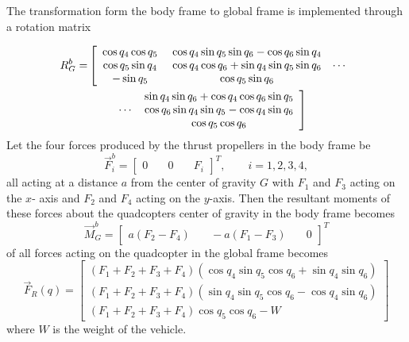 \documentclass[twocolumn,10pt]{asme2e}
\begin{document}
The transformation form the body frame to global frame is implemented through a rotation matrix
{\small
\begin{align}
	R^b_G=&
	\left[\begin{array}{ccc} \cos{q_{4}}\cos{q_{5}} &~ \cos{q_{4}}\sin{q_{5}}\sin{q_{6}}-\cos{q_{6}}\sin{q_{4}} & \\ 
		\cos{q_{5}}\sin{q_{4}} & ~\cos{q_{4}}\cos{q_{6}}+\sin{q_{4}}\sin{q_{5}}\sin{q_{6}} & \cdots\\ 
		-\sin{q_{5}} & ~\cos{q_{5}}\sin{q_{6}} &  \end{array}\right.\notag\\
&\qquad	
\left.\begin{array}{cc}
&\sin{q_{4}}\sin{q_{6}}+\cos{q_{4}}\cos{q_{6}}\sin{q_{5}}\\
\cdots&\cos{q_{6}}\sin{q_{4}}\sin{q_{5}}-\cos{q_{4}}\sin{q_{6}}\\
&\cos{q_{5}}\cos{q_{6}}\end{array}\right]
\end{align}
Let the four forces produced by the thrust propellers in the body frame be
\begin{equation}
\vec{F}_{i}^b=\left[\begin{array}{ccc}
	0&\quad
	0&\quad
	F_{i}
\end{array}\right]^T,\qquad i=1,2,3,4,
\end{equation}
all acting at a distance $a$ from the center of gravity $G$ with $F_1$ and $F_3$ acting on the $x$- axis and $F_2$ and $F_4$ acting on the $y$-axis. Then the resultant moments of these forces about the quadcopters center of gravity in the body frame becomes 
\begin{equation}
	\vec{M}^b_G=\left[\begin{array}{ccc}
		a\left(F_{2}-F_{4}\right)&\quad
		-a\left(F_{1}-F_{3}\right)&\quad
		0
	\end{array}\right]^T
\end{equation}
of all forces acting on the quadcopter in the global frame becomes
\begin{equation}
\vec{F}_{R}(q)=\left[\begin{array}{c}
	(F_{1}+F_{2}+F_{3}+F_{4})\left(\cos q_4 \sin q_5 \cos q_6+\sin q_4\sin q_6\right)\\
	(F_{1}+F_{2}+F_{3}+F_{4})\left(\sin q_4 \sin q_5 \cos q_6-\cos q_4\sin q_6\right)\\
	\left(F_{1}+F_{2}+F_{3}+F_{4}\right)\cos q_{5}\cos q_{6}-W
\end{array}\right]
\end{equation}
where $W$ is the weight of the vehicle. 

}
\end{document}
